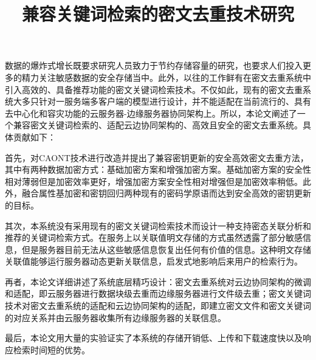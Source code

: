 \documentclass[promaster]{thesis-uestc}
\title{兼容关键词检索的密文去重技术研究}{English Title} %
\author{\quad}{\quad} %
\begin{document}
\makecover %
\originalitydeclaration %
\begin{chineseabstract}
    数据的爆炸式增长既要求研究人员致力于节约存储容量的研究，也要求人们投入更多的精力关注敏感数据的安全存储当中。此外，以往的工作鲜有在密文去重系统中引入高效的、具备推荐功能的密文关键词检索技术。不仅如此，现有的密文去重系统大多只针对一服务端多客户端的模型进行设计，并不能适配在当前流行的、具有去中心化和容灾功能的云服务器-边缘服务器协同架构上。所以，本论文阐述了一个兼容密文关键词检索的、适配云边协同架构的、高效且安全的密文去重系统。具体贡献如下：

    首先，对\acrshort{CAONT}技术进行改造并提出了兼容密钥更新的安全高效密文去重方法，其中有两种数据加密方式：基础加密方案和增强加密方案。基础加密方案的安全性相对薄弱但是加密效率更好，增强加密方案安全性相对增强但是加密效率稍低。此外，融合属性基加密和密钥回归两种现有的密码学原语而达到安全高效的密钥更新的目标。

    其次，本系统没有采用现有的密文关键词检索技术而设计一种支持密态关联分析和推荐的关键词检索方式。在服务上以关联值明文存储的方式虽然透露了部分敏感信息，但是服务器目前无法从这些敏感信息恢复出任何有价值的信息。这种明文存储关联值能够运行服务器动态更新关联信息，启发式地影响后来用户的检索行为。

    再者，本论文详细讲述了系统底层精巧设计：密文去重系统对云边协同架构的微调和适配，即云服务器进行数据块级去重而边缘服务器进行文件级去重；密文关键词技术对密文去重系统的适配和云边协同架构的适配，即建立密文文件和密文关键词的对应关系并由云服务器收集所有边缘服务器的关联信息。

    最后，本论文用大量的实验证实了本系统的存储开销低、上传和下载速度快以及响应检索时间短的优势。

\end{chineseabstract}
\end{document}

